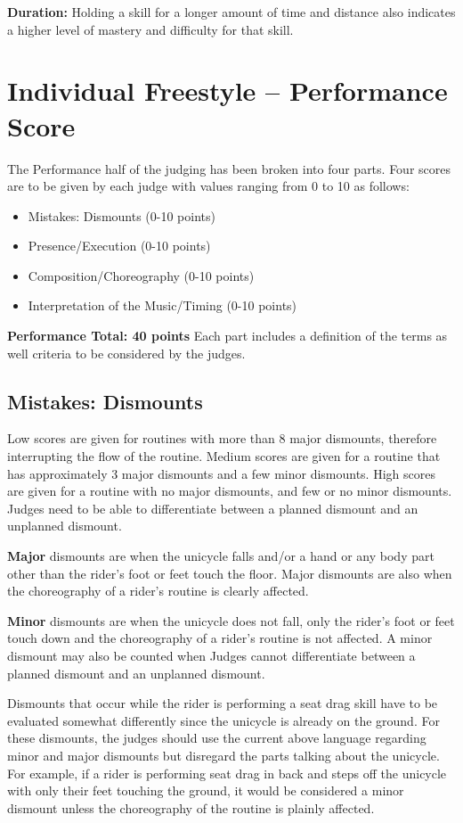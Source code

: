 \textbf{Duration:} Holding a skill for a longer amount of time and distance also indicates a higher level of mastery and difficulty for that skill.

\section{Individual Freestyle -- Performance Score \label{sec:freestyle_individual-performance-score}}
The Performance half of the judging has been broken into four parts.
Four scores are to be given by each judge with values ranging from 0 to 10 as follows:
\begin{itemize}
\item Mistakes: Dismounts (0-10 points)
\item Presence/Execution (0-10 points)
\item Composition/Choreography (0-10 points)
\item Interpretation of the Music/Timing (0-10 points)
\end{itemize}
\textbf{Performance Total: 40 points}
Each part includes a definition of the terms as well criteria to be considered by the judges.

\subsection{Mistakes: Dismounts}
Low scores are given for routines with more than 8 major dismounts, therefore interrupting the flow of the routine.
Medium scores are given for a routine that has approximately 3 major dismounts and a few minor dismounts.
High scores are given for a routine with no major dismounts, and few or no minor dismounts.
Judges need to be able to differentiate between a planned dismount and an unplanned dismount.

\textbf{Major} dismounts are when the unicycle falls and/or a hand or any body part other than the rider's foot or feet touch the floor.
Major dismounts are also when the choreography of a rider's routine is clearly affected.

\textbf{Minor} dismounts are when the unicycle does not fall, only the rider's foot or feet touch down and the choreography of a rider's routine is not affected.
A minor dismount may also be counted when Judges cannot differentiate between a planned dismount and an unplanned dismount.

Dismounts that occur while the rider is performing a seat drag skill have to be evaluated somewhat differently since the unicycle is already on the ground.
For these dismounts, the judges should use the current above language regarding minor and major dismounts but disregard the parts talking about the unicycle.
For example, if a rider is performing seat drag in back and steps off the unicycle with only their feet touching the ground, it would be considered a minor dismount unless the choreography of the routine is plainly affected.

